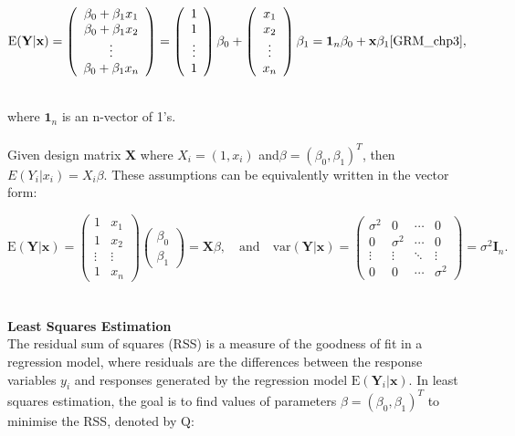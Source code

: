 \documentclass{article}\usepackage[]{graphicx}\usepackage[]{xcolor}
\begin{document}
$$\mathrm{E}(\mathbf{Y} | \mathbf{x}) =
\left( \begin{array}{ccc}
\beta_0+\beta_1 x_1\\
\beta_0+\beta_1 x_2\\
\vdots\\
\beta_0+\beta_1 x_n
\end{array} \right) = 
\left( \begin{array}{ccc}
1\\
1\\
\vdots\\
1
\end{array} \right) \beta_0 + 
\left( \begin{array}{ccc}
x_1\\
x_2\\
\vdots\\
x_n
\end{array} \right) \beta_1 =
\mathbf{1}_n \beta_0 + \mathbf{x} \beta_1 \cite{GRM_chp3},
$$ 

\\
\noindent
where $\mathbf{1}_n$ is an n-vector of 1's.
\\  
\\Given design matrix $\mathbf{X}$ where $X_i = (1, x_i)$ and$\beta = (\beta_0, \beta_1)^T$, then $E(Y_i|x_i) = X_i \beta$. These assumptions can be equivalently written in the vector form:

\[\mathrm{E}(\mathbf{Y} | \mathbf{x}) = 
\left( \begin{array}{cc}
1 & x_1\\
1 & x_2\\
\vdots& \vdots\\
1 & x_n
\end{array} \right) 
\left( \begin{array}{cc}
\beta_0 \\
\beta_1
\end{array} \right) = \mathbf{X} \beta, \quad \text{and} \quad
\text{var}(\mathbf{Y} | \mathbf{x}) =
\begin{pmatrix}
\sigma^2 & 0 & \cdots & 0 \\
0 & \sigma^2 & \cdots & 0 \\
\vdots & \vdots & \ddots & \vdots \\
0 & 0 & \cdots & \sigma^2
\end{pmatrix} = \sigma^2 \mathbf{I}_n.
\]
\\  
\\
\noindent
\textbf{Least Squares Estimation}
\\ \noindent
The residual sum of squares (RSS) is a measure of the goodness of fit in a regression model, where residuals are the differences between the response variables $y_i$ and responses generated by the regression model $\mathrm{E}(\mathbf{Y}_i | \mathbf{x})$. In least squares estimation, the goal is to find values of parameters $\beta = (\beta_0, \beta_1)^T$ to minimise the RSS, denoted by $\mathrm{Q}$: 
\end{document}
